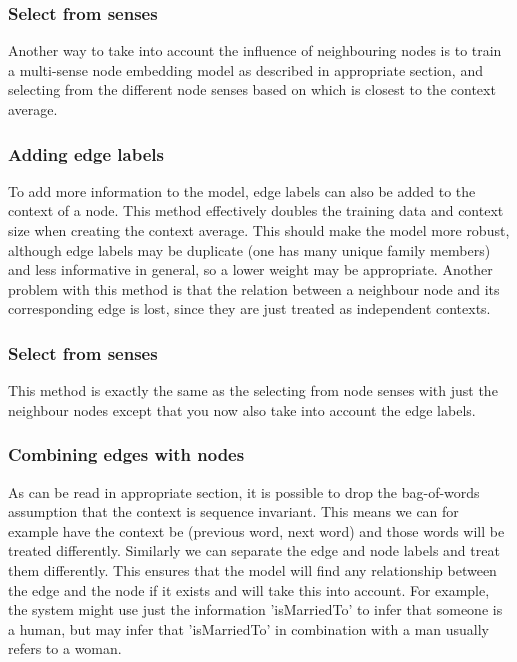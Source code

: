 \documentclass{article}
\begin{document}
  \subsubsection{Select from senses}
  Another way to take into account the influence of neighbouring nodes is to train a multi-sense node embedding model as described in {appropriate section}, and selecting from the different node senses based on which is closest to the context average.
  \subsubsection{Adding edge labels}
  To add more information to the model, edge labels can also be added to the context of a node. This method effectively doubles the training data and context size when creating the context average. This should make the model more robust, although edge labels may be duplicate (one has many unique family members) and less informative in general, so a lower weight may be appropriate. Another problem with this method is that the relation between a neighbour node and its corresponding edge is lost, since they are just treated as independent contexts.
  \subsubsection{Select from senses}
  This method is exactly the same as the selecting from node senses with just the neighbour nodes except that you now also take into account the edge labels.
  \subsubsection{Combining edges with nodes}
  As can be read in {appropriate section}, it is possible to drop the bag-of-words assumption that the context is sequence invariant. 
  This means we can for example have the context be (previous word, next word) and those words will be treated differently. Similarly we can separate the edge and node labels and treat them differently. This ensures that the model will find any relationship between the edge and the node if it exists and will take this into account. For example, the system might use just the information 'isMarriedTo' to infer that someone is a human, but may infer that 'isMarriedTo' in combination with a man usually refers to a woman.
\end{document}
